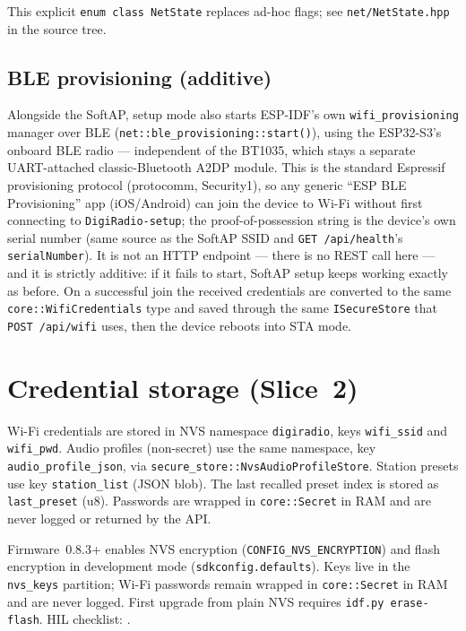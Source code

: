 This explicit \texttt{enum class NetState} replaces ad-hoc flags; see
\texttt{net/NetState.hpp} in the source tree.

\subsection{BLE provisioning (additive)}
\label{sec:api-boot-ble-provisioning}

Alongside the SoftAP, setup mode also starts ESP-IDF's own
\texttt{wifi\_provisioning} manager over BLE
(\texttt{net::ble\_provisioning::start()}), using the ESP32-S3's onboard
BLE radio --- independent of the BT1035, which stays a separate UART-attached
classic-Bluetooth A2DP module. This is the standard Espressif provisioning
protocol (protocomm, Security1), so any generic ``ESP BLE Provisioning''
app (iOS/Android) can join the device to Wi-Fi without first connecting to
\texttt{DigiRadio-setup}; the proof-of-possession string is the device's
own serial number (same source as the SoftAP SSID and
\texttt{GET /api/health}'s \texttt{serialNumber}). It is not an HTTP
endpoint --- there is no REST call here --- and it is strictly additive:
if it fails to start, SoftAP setup keeps working exactly as before. On a
successful join the received credentials are converted to the same
\texttt{core::WifiCredentials} type and saved through the same
\texttt{ISecureStore} that \texttt{POST /api/wifi} uses, then the device
reboots into STA mode.

\section{Credential storage (Slice~2)}
\label{sec:api-storage}

Wi-Fi credentials are stored in NVS namespace \texttt{digiradio}, keys
\texttt{wifi\_ssid} and \texttt{wifi\_pwd}. Audio profiles (non-secret) use
the same namespace, key \texttt{audio\_profile\_json}, via
\texttt{secure\_store::NvsAudioProfileStore}. Station presets use key
\texttt{station\_list} (JSON blob). The last recalled preset index is stored
as \texttt{last\_preset} (u8). Passwords are wrapped in
\texttt{core::Secret} in RAM and are never logged or returned by the API.

\begin{drcaution}
Firmware~0.8.3+ enables NVS encryption
(\texttt{CONFIG\_NVS\_ENCRYPTION}) and flash encryption in development mode
(\texttt{sdkconfig.defaults}). Keys live in the \texttt{nvs\_keys} partition;
Wi-Fi passwords remain wrapped in \texttt{core::Secret} in RAM and are never
logged. First upgrade from plain NVS requires \texttt{idf.py erase-flash}.
HIL checklist: .
\end{drcaution}
